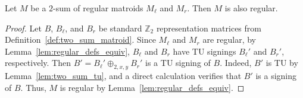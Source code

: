 \begin{lemma}\label{lem:two_sum_regular}
    Let $M$ be a $2$-sum of regular matroids $M_{\ell}$ and $M_{r}$. Then $M$ is also regular.
\end{lemma}

\begin{proof}
    Let $B$, $B_{\ell}$, and $B_{r}$ be standard $\mathbb{Z}_{2}$ representation matrices from Definition~\ref{def:two_sum_matroid}. Since $M_{\ell}$ and $M_{r}$ are regular, by Lemma~\ref{lem:regular_defs_equiv}, $B_{\ell}$ and $B_{r}$ have TU signings $B_{\ell}'$ and $B_{r}'$, respectively. Then $B' = B_{\ell}' \oplus_{2, x, y} B_{r}'$ is a TU signing of $B$. Indeed, $B'$ is TU by Lemma~\ref{lem:two_sum_tu}, and a direct calculation verifies that $B'$ is a signing of $B$. Thus, $M$ is regular by Lemma~\ref{lem:regular_defs_equiv}.
\end{proof}
